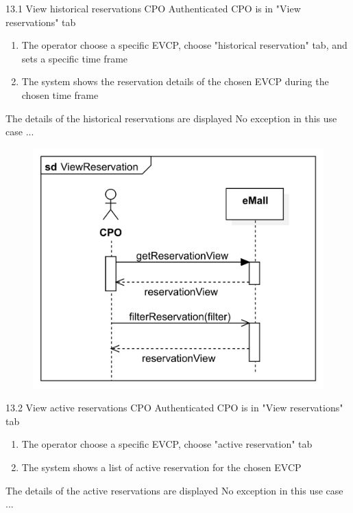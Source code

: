 \usecase
{
}
{13.1}
{View historical reservations} %
{CPO} %
{Authenticated CPO is in "View reservations" tab} %
{ %
    \begin{enumerate}
        \item The operator choose a specific EVCP, choose "historical reservation" tab, and sets a specific time frame
        \item The system shows the reservation details of the chosen EVCP during the chosen time frame
    \end{enumerate}
}
{The details of the historical reservations are displayed} %
{ %
    No exception in this use case
}
{ %
    ...
}

\usecase
{
    \begin{figure}[H]
        \centering
        \includegraphics[scale=0.9]{src/sequence_diagram/ViewReservation.png}
    \end{figure}
}
{13.2}
{View active reservations} %
{CPO} %
{Authenticated CPO is in "View reservations" tab} %
{ %
    \begin{enumerate}
        \item The operator choose a specific EVCP, choose "active reservation" tab
        \item The system shows a list of active reservation for the chosen EVCP
    \end{enumerate}
}
{The details of the active reservations are displayed} %
{ %
    No exception in this use case
}
{ %
    ...
}

